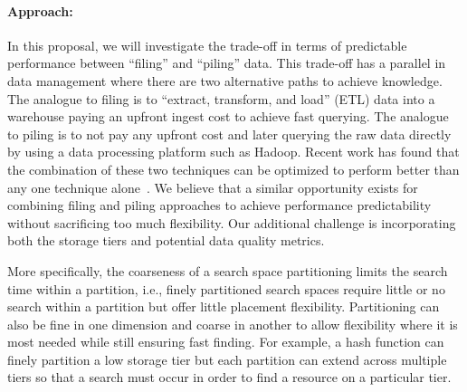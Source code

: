 \paragraph{Approach:} 
In this proposal, we will investigate the trade-off in terms of predictable
performance between ``filing'' and ``piling'' data.  This trade-off has a
parallel in data management where there are two alternative paths to achieve
knowledge. The analogue to filing is  to ``extract, transform, and load'' (ETL)
data into a warehouse paying an upfront ingest cost to achieve fast querying.
The analogue to piling is to not pay any upfront cost and later querying the
raw data directly by using a data processing platform such as Hadoop.  Recent
work has found that the combination of these two techniques can be optimized to
perform better than any one technique alone~\cite{lefevre:sigmod14a}. We
believe that a similar opportunity exists for combining filing and piling
approaches to achieve performance predictability without sacrificing too much
flexibility. Our additional challenge is incorporating both the storage tiers
and potential data quality metrics.

More specifically, the coarseness of a search space partitioning limits the
search time within a partition, i.e., finely partitioned search spaces require
little or no search within a partition but offer little placement flexibility.
Partitioning can also be fine in one dimension and coarse in another to allow
flexibility where it is most needed while still ensuring fast finding. For
example, a hash function can finely partition a low storage tier but each
partition can extend across multiple tiers so that a search must occur in order
to find a resource on a particular tier.  


